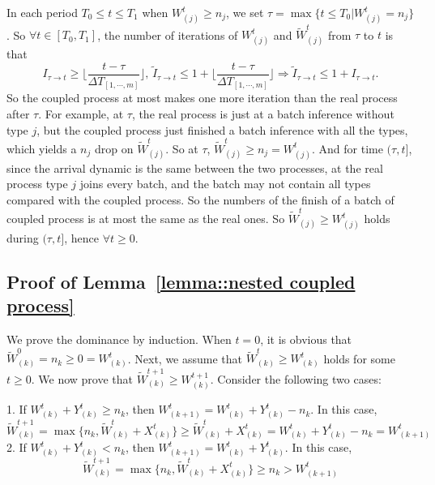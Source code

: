 In each period $T_0\leq t\leq T_1$ when $W^t_{(j)}\geq n_j$, we set $\tau = \max\{t\leq T_0|W^t_{(j)} = n_j \}$. So $\forall t\in [T_0, T_1]$, the number of iterations of $W^t_{(j)}$ and $\tilde{W}^t_{(j)}$ from $\tau$ to $t$ is that
$$I_{\tau\to t} \geq \lfloor\frac{t-\tau}{\Delta T_{[1,\cdots,m]}}\rfloor ,\,\tilde{I}_{\tau\to t}\leq 1+\lfloor\frac{t-\tau}{\Delta T_{[1,\cdots,m]}}\rfloor \Rightarrow \tilde{I}_{\tau\to t}\leq 1+I_{\tau\to t}.$$
So the coupled process at most makes one more iteration than the real process after $\tau$. For example, at $\tau$, the real process is  just at a batch inference without type $j$, but the coupled process just finished a batch inference with all the types, which yields a $n_j$ drop on $\tilde{W}_{(j)}^t$. So at $\tau$, $\tilde{W}_{(j)}^t\geq n_j = W_{(j)}^t$. And for time $(\tau,t]$, since the arrival dynamic is the same between the two processes,  at the real process type $j$ joins every batch, and the batch may not contain all types compared with the coupled process. So the numbers of the finish of a batch of coupled process is at most the same as the real ones. So $\tilde{W}^t_{(j )}\geq W^t_{(j )}$ holds during $(\tau, t]$, hence $\forall t\geq 0$. 

\subsection{Proof of Lemma~\ref{lemma::nested coupled process}}\label{appendix_lemma::proof of nested coupled process}
We prove the dominance by induction. When $t = 0$, it is obvious that $ \tilde{W}_{(k)}^0 = n_{k}\geq 0=W_{(k)}^t $. Next, we assume that $\tilde{W}^t_{(k)}\geq W^t_{(k)}  $ holds for some $t\geq 0$. We now prove that $\tilde{W}^{t+1}_{(k)}\geq W^{t+1}_{(k)}  $. Consider the following two cases:

1. If $ W^t_{(k)}+ Y^t_{(k)}\geq n_k $, then $W^t_{(k+1)}= W^{t}_{(k)}+Y^t_{(k)}  -  n_k $. In this case, 
$$ \tilde{W}^{t+1}_{(k)}=  \max\{ n_{k},\tilde{W}^{t}_{(k)} + X^t_{(k)}\} \geq \tilde{W}^{t}_{(k)} + X^t_{(k)}={W}^{t}_{(k)} + Y^t_{(k)}-n_k=W^t_{(k+1)}$$
2. If $ W^t_{(k)}+ Y^t_{(k)}<n_k $, then $W^t_{(k+1)}= W^{t}_{(k)}+Y^t_{(k)}$. In this case, 
$$\tilde{W}^{t+1}_{(k)}=  \max\{ n_{k},\tilde{W}^{t}_{(k)} + X^t_{(k)}\} \geq n_{k}> W^t_{(k+1)}$$

